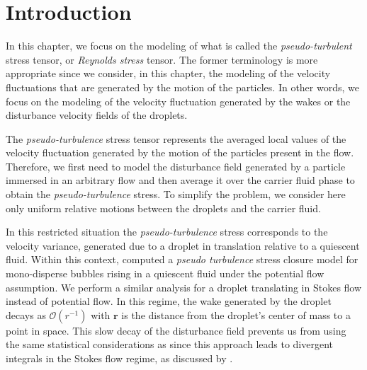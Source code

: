 
\section{Introduction}


In this chapter, we focus on the modeling of what is called the \textit{pseudo-turbulent} stress tensor, or \textit{Reynolds stress} tensor. 
The former terminology is more appropriate since we consider, in this chapter, the modeling of the velocity fluctuations that are generated by the motion of the particles. 
In other words, we focus on the modeling of the velocity fluctuation generated by the wakes or the disturbance velocity fields of the droplets. 


The \textit{pseudo-turbulence} stress tensor represents the averaged local values of the velocity fluctuation generated by the motion of the particles present in the flow. 
Therefore, we first need to model the disturbance field generated by a particle immersed in an arbitrary flow and then average it over the carrier fluid phase to obtain the \textit{pseudo-turbulence} stress. 
To simplify the problem, we consider here only uniform relative motions between the droplets and the carrier fluid. 

In this restricted situation the \textit{pseudo-turbulence} stress corresponds to the velocity variance, generated due to a droplet in translation relative to a quiescent fluid.
Within this context, \citet{biesheuvel1984two,van1998pseudo,zhang1994ensemble} computed a \textit{pseudo turbulence} stress closure model for mono-disperse bubbles rising in a quiescent fluid under the potential flow assumption. 
We perform a similar analysis for a droplet translating in Stokes flow instead of potential flow. In this regime, the wake generated by the droplet decays as $\mathcal{O}(r^{-1})$ with $\textbf{r}$ is the distance from the droplet's center of mass to a point in space. 
This slow decay of the disturbance field prevents us from using the same statistical considerations as \citet{van1998pseudo}  since this approach leads to divergent integrals in the Stokes flow regime, as discussed by \citet{caflisch1985variance}. 


